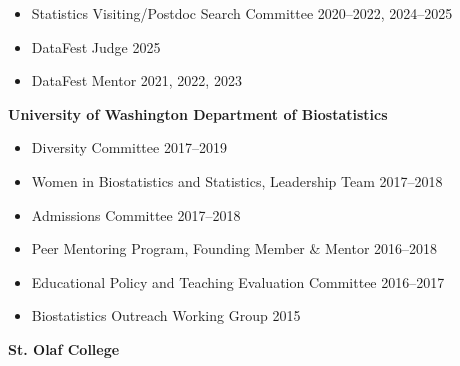 \documentclass[margin]{res}
\begin{document}
\begin{resume}
\begin{itemize}
\begin{itemize}
		\item Statistics Visiting/Postdoc Search Committee \hfill 2020--2022, 2024--2025
		
		\item DataFest Judge \hfill 2025
		
		\item DataFest Mentor  \hfill 2021, 2022, 2023%
		    
		

		
		\end{itemize}
	\end{itemize}


\textbf{University of Washington Department of Biostatistics}
\begin{itemize} %
	
	\item Diversity Committee \hfill 2017--2019
	
	\item Women in Biostatistics and Statistics, Leadership Team \hfill 2017--2018
	
	\item Admissions Committee \hfill 2017--2018
	
	\item Peer Mentoring Program, Founding Member \& Mentor \hfill 2016--2018
	
	\item Educational Policy and Teaching Evaluation Committee \hfill 2016--2017
	
	\item Biostatistics Outreach Working Group \hfill 2015%
\end{itemize}



\textbf{St. Olaf College}
\begin{itemize}
			

\end{itemize}
\end{resume}
\end{document}
